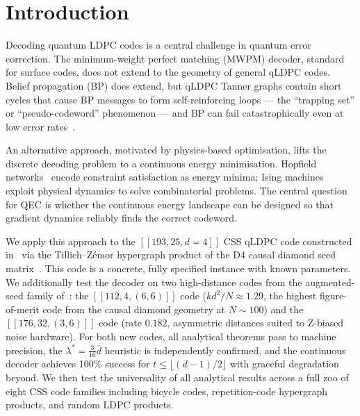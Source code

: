 \documentclass[12pt,a4paper]{article}
\theoremstyle{plain}
\theoremstyle{definition}
\theoremstyle{remark}
\begin{document}
\section{Introduction}\label{sec:intro}

Decoding quantum LDPC codes is a central challenge in quantum error
correction.
The minimum-weight perfect matching (MWPM) decoder, standard for surface
codes, does not extend to the geometry of general qLDPC codes.
Belief propagation (BP) does extend, but qLDPC Tanner graphs contain
short cycles that cause BP messages to form self-reinforcing loops ---
the ``trapping set'' or ``pseudo-codeword'' phenomenon --- and BP can fail
catastrophically even at low error rates~\cite{Poulin2008,Roffe2020}.

An alternative approach, motivated by physics-based optimisation, lifts
the discrete decoding problem to a continuous energy minimisation.
Hopfield networks~\cite{Hopfield1982} encode constraint satisfaction as
energy minima; Ising machines~\cite{Inagaki2016} exploit physical dynamics
to solve combinatorial problems.
The central question for QEC is whether the continuous energy landscape can
be designed so that gradient dynamics reliably finds the correct codeword.

We apply this approach to the $[[193,25,d=4]]$ CSS qLDPC code
constructed in~\cite{SchmittScale} via the Tillich--Z\'emor hypergraph
product of the D4 causal diamond seed matrix~\cite{SchmittCSS}.
This code is a concrete, fully specified instance with known parameters.
We additionally test the decoder on two high-distance codes from the
augmented-seed family of~\cite{SchmittScale}: the $[[112,4,(6,6)]]$
code ($kd^2/N \approx 1.29$, the highest figure-of-merit code from the
causal diamond geometry at $N\sim100$) and the $[[176,32,(3,6)]]$ code
(rate $0.182$, asymmetric distances suited to Z-biased noise hardware).
For both new codes, all analytical theorems pass to machine precision,
the $\lambda^* = \tfrac{3}{16}\bar{d}$ heuristic is independently
confirmed, and the continuous decoder achieves 100\% success for
$t\leq\lfloor(d-1)/2\rfloor$ with graceful degradation beyond.
We then test the universality of all analytical results across a full
zoo of eight CSS code families including bicycle codes, repetition-code
hypergraph products, and random LDPC products.
\end{document}
